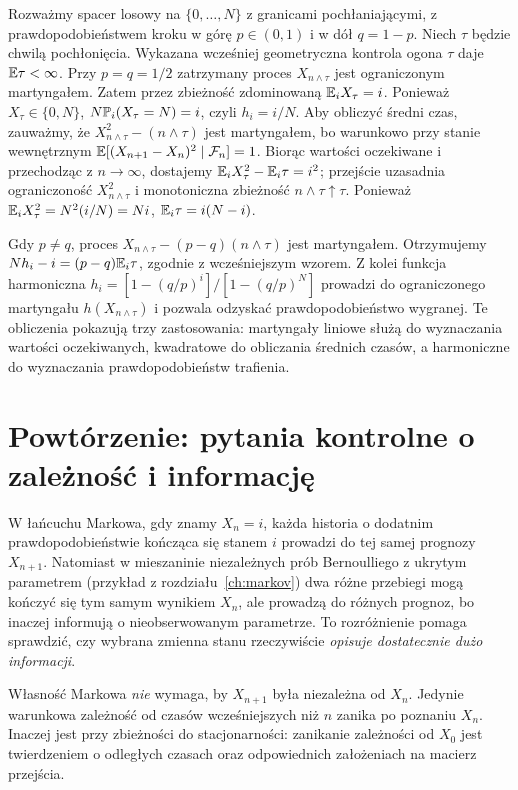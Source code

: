 \begin{przyklad}
Rozważmy spacer losowy na $\{0,\ldots,N\}$
z granicami pochłaniającymi, z prawdopodobieństwem
kroku w górę $p\in(0,1)$ i w dół $q=1-p$.
Niech $\tau$ będzie chwilą pochłonięcia.
Wykazana wcześniej geometryczna kontrola ogona
$\tau$ daje $\mathbb{E}\tau<\infty$.
Przy $p=q=1/2$ zatrzymany proces $X_{n\wedge\tau}$
jest ograniczonym martyngałem. Zatem przez
zbieżność zdominowaną
$\mathbb{E}_iX_\tau=i$. Ponieważ $X_\tau\in\{0,N\}$,
$N\mathbb{P}_i(X_\tau=N)=i$, czyli $h_i=i/N$.
Aby obliczyć średni czas, zauważmy, że
$X_{n\wedge\tau}^2-(n\wedge\tau)$ jest
martyngałem, bo warunkowo przy stanie wewnętrznym
$\mathbb{E}[(X_{n+1}-X_n)^2\mid\mathcal F_n]=1$.
Biorąc wartości oczekiwane i przechodząc z
$n\to\infty$, dostajemy
$\mathbb{E}_i X_\tau^2-\mathbb{E}_i\tau=i^2$;
przejście uzasadnia ograniczoność $X_{n\wedge\tau}^2$
i monotoniczna zbieżność $n\wedge\tau\uparrow\tau$.
Ponieważ $\mathbb{E}_iX_\tau^2=N^2(i/N)=Ni$,
$\mathbb{E}_i\tau=i(N-i)$.

Gdy $p\ne q$, proces
$X_{n\wedge\tau}-(p-q)(n\wedge\tau)$ jest
martyngałem. Otrzymujemy
$N h_i-i=(p-q)\mathbb{E}_i\tau$, zgodnie z wcześniejszym
wzorem. Z kolei funkcja harmoniczna
$h_i=[1-(q/p)^i]/[1-(q/p)^N]$
prowadzi do ograniczonego martyngału $h(X_{n\wedge\tau})$
i pozwala odzyskać prawdopodobieństwo wygranej.
Te obliczenia pokazują trzy zastosowania: martyngały liniowe
służą do wyznaczania wartości oczekiwanych, kwadratowe
do obliczania średnich czasów, a harmoniczne do
wyznaczania prawdopodobieństw trafienia.
\end{przyklad}



\section{Powtórzenie: pytania kontrolne o zależność i informację}

\begin{przyklad}
W łańcuchu Markowa, gdy znamy $X_n=i$, każda historia
o dodatnim prawdopodobieństwie kończąca się stanem $i$
prowadzi do tej samej prognozy $X_{n+1}$.
Natomiast w mieszaninie niezależnych prób
Bernoulliego z ukrytym parametrem (przykład z
rozdziału~\ref{ch:markov}) dwa różne przebiegi
mogą kończyć się tym samym wynikiem $X_n$, ale
prowadzą do różnych prognoz, bo inaczej informują
o nieobserwowanym parametrze. To rozróżnienie
pomaga sprawdzić, czy wybrana zmienna stanu
rzeczywiście \emph{opisuje dostatecznie dużo informacji}.

Własność Markowa \emph{nie} wymaga, by $X_{n+1}$
była niezależna od $X_n$. Jedynie warunkowa
zależność od czasów wcześniejszych niż $n$
zanika po poznaniu $X_n$. Inaczej jest przy
zbieżności do stacjonarności: zanikanie zależności
od $X_0$ jest twierdzeniem o odległych czasach
oraz odpowiednich założeniach na macierz przejścia.
\end{przyklad}

